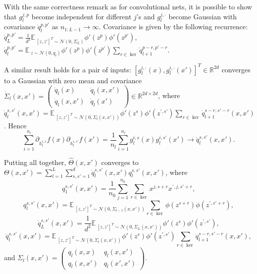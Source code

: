 \documentclass{article}
\newcommand{\EE}{\mathbb{E}\,}
\newcommand{\RR}{\mathbb{R}}
\newcommand{\NN}{\mathcal{N}}
\begin{document}
    With the same correctness remark as for convolutional nets, it is possible to show that $g_l^{j,p}$ become independent for different $j$'s and $g_l^{j,\cdot}$ become Gaussian with covariance $\dot q_l^{p,p'}$ as $n_{1:L-1} \to \infty$.
    Covariance is given by the following recurrence: $\dot q_L^{p,p'} = \frac{1}{d^2} \EE_{[z,z']^T \sim \NN(0,\Sigma_L)} \phi'(z^p) \phi'(z^{p'})$, $\dot q_l^{p,p'} = \EE_{z \sim \NN(0,q_l)} \phi'(z^{p}) \phi'(z^{p'}) \sum_{r \in \ker} \dot q_{l+1}^{p-r,p'-r}$.

    A similar result holds for a pair of inputs: $[g_l^{i,\cdot}(x),g_l^{i,\cdot}(x')]^T \in \RR^{2d}$ converges to a Gaussian with zero mean and covariance $\dot\Sigma_l(x,x') = \begin{pmatrix} \dot q_l(x) & \dot q_l(x,x')\\\dot q_l(x,x') & \dot q_l(x') \end{pmatrix} \in \RR^{2d \times 2d}$, where $\dot q_l^{s,s'}(x,x') = \EE_{[z,z']^T \sim \NN(0,\Sigma_l(x,x'))} \phi'(z^{s}) \phi'(z^{\prime,s'}) \sum_{r \in \ker} \dot q_{l+1}^{s-r,s'-r}(x,x')$.
    Hence
    \begin{equation}
        \sum_{i=1}^{n_l} \partial_{h_l^{i,s}} f(x) \partial_{h_l^{i,s'}} f(x') 
        = \frac{1}{n_l} \sum_{i=1}^{n_l} g_l^{i,s}(x) g_l^{i,s'}(x')
        \to \dot q_l^{s,s'}(x,x').
    \end{equation}

    Putting all together, $\hat\Theta(x,x')$ converges to $\Theta(x,x') = \sum_{l=1}^L \sum_{s,s'=1}^d \dot q_l^{s,s'}(x,x') q_l^{s,s'}(x,x')$, where
    \begin{equation}
        q_1^{s,s'}(x,x') = \frac{1}{n_0} \sum_{j=1}^{n_0} \sum_{r \in \ker} x^{j,s+r} x^{\prime,j,s'+r},
    \end{equation}
    \begin{equation}
        q_l^{s,s'}(x,x') = \EE_{[z,z']^T \sim \NN(0,\Sigma_{l-1}(x,x'))} \sum_{r \in \ker} \phi(z^{s+r}) \phi(z^{\prime,s'+r}),
    \end{equation}
    \begin{equation}
        \dot q_L^{s,s'}(x,x') = \frac{1}{d^2} \EE_{[z,z']^T \sim \NN(0,\Sigma_L(x,x'))} \phi'(z^s) \phi'(z^{\prime,s'}), 
    \end{equation}
    \begin{equation}
        \dot q_l^{s,s'}(x,x') = \EE_{[z,z']^T \sim \NN(0,\Sigma_l(x,x'))} \phi'(z^{s}) \phi'(z^{\prime,s'}) \sum_{r \in \ker} \dot q_{l+1}^{s-r,s'-r}(x,x'),
    \end{equation}
    and $\Sigma_l(x,x') = \begin{pmatrix} q_l(x,x) & q_l(x,x')\\q_l(x,x') & q_l(x',x') \end{pmatrix}$.
\end{document}
